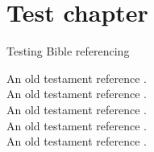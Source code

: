 \documentclass[twoside,14pt,onecolumn,openright ,a4paper]{memoir}
\begin{document}
        \chapter{Test chapter}
            \beginnumbering
            \pstart
            \lipsum[1]
        Testing Bible referencing 
        \lipsum[1]
        \pend

            \pstart 
        \lipsum[1]


            An old testament reference .\\
            An old testament reference .\\
            An old testament reference .\\
            An old testament reference .\\
            An old testament reference .\\
            \lipsum[1]
            \pend
            \endnumbering

            \backmatter
            \printindex[bible]
        
\end{document}
